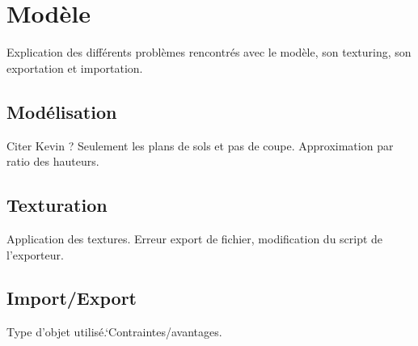 \section{Modèle}
Explication des différents problèmes rencontrés avec le modèle, son texturing, son exportation et importation.

\subsection{Modélisation}
Citer Kevin ?
Seulement les plans de sols et pas de coupe. Approximation par ratio des hauteurs.

\subsection{Texturation}
Application des textures.
Erreur export de fichier, modification du script de l'exporteur.

\subsection{Import/Export}
Type d'objet utilisé.`Contraintes/avantages.